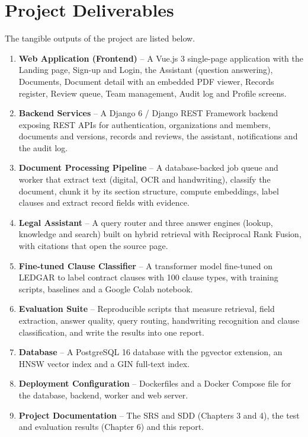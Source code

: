 \section{Project Deliverables}
The tangible outputs of the project are listed below.
\begin{enumerate}
\item \textbf{\sysname{} Web Application (Frontend)} -- A Vue.js 3 single-page application with the
Landing page, Sign-up and Login, the Assistant (question answering), Documents, Document detail with
an embedded PDF viewer, Records register, Review queue, Team management, Audit log and Profile
screens.
\item \textbf{Backend Services} -- A Django 6 / Django REST Framework backend exposing REST APIs for
authentication, organizations and members, documents and versions, records and reviews, the
assistant, notifications and the audit log.
\item \textbf{Document Processing Pipeline} -- A database-backed job queue and worker that extract
text (digital, OCR and handwriting), classify the document, chunk it by its section structure,
compute embeddings, label clauses and extract record fields with evidence.
\item \textbf{Legal Assistant} -- A query router and three answer engines (lookup, knowledge and
search) built on hybrid retrieval with Reciprocal Rank Fusion, with citations that open the source
page.
\item \textbf{Fine-tuned Clause Classifier} -- A transformer model fine-tuned on LEDGAR to label
contract clauses with 100 clause types, with training scripts, baselines and a Google Colab notebook.
\item \textbf{Evaluation Suite} -- Reproducible scripts that measure retrieval, field extraction,
answer quality, query routing, handwriting recognition and clause classification, and write the
results into one report.
\item \textbf{Database} -- A PostgreSQL 16 database with the pgvector extension, an HNSW vector index
and a GIN full-text index.
\item \textbf{Deployment Configuration} -- Dockerfiles and a Docker Compose file for the database,
backend, worker and web server.
\item \textbf{Project Documentation} -- The SRS and SDD (Chapters 3 and 4), the test and evaluation
results (Chapter 6) and this report.
\end{enumerate}

